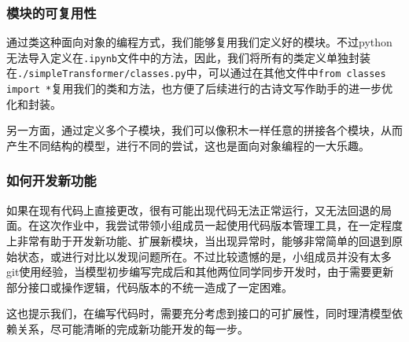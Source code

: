 \subsubsection{模块的可复用性}

通过类这种面向对象的编程方式，我们能够复用我们定义好的模块。不过python无法导入定义在\texttt{.ipynb}文件中的方法，因此，我们将所有的类定义单独封装在\texttt{./simpleTransformer/classes.py}中，可以通过在其他文件中\texttt{from classes import *}复用我们的类和方法，也方便了后续进行的古诗文写作助手的进一步优化和封装。

另一方面，通过定义多个子模块，我们可以像积木一样任意的拼接各个模块，从而产生不同结构的模型，进行不同的尝试，这也是面向对象编程的一大乐趣。

\subsubsection{如何开发新功能}

如果在现有代码上直接更改，很有可能出现代码无法正常运行，又无法回退的局面。在这次作业中，我尝试带领小组成员一起使用代码版本管理工具，在一定程度上非常有助于开发新功能、扩展新模块，当出现异常时，能够非常简单的回退到原始状态，或进行对比以发现问题所在。不过比较遗憾的是，小组成员并没有太多git使用经验，当模型初步编写完成后和其他两位同学同步开发时，由于需要更新部分接口或操作逻辑，代码版本的不统一造成了一定困难。

这也提示我们，在编写代码时，需要充分考虑到接口的可扩展性，同时理清模型依赖关系，尽可能清晰的完成新功能开发的每一步。